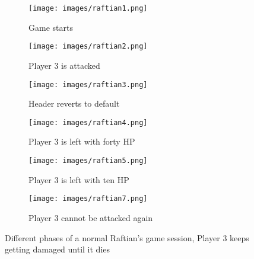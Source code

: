 \begin{figure}[h]
    \centering
    \begin{subfigure}{0.31\textwidth}
        \texttt{[image: images/raftian1.png]}
        \caption{Game starts}
    \end{subfigure}
    \hfill
    \begin{subfigure}{0.31\textwidth}
        \texttt{[image: images/raftian2.png]}
        \caption{Player 3 is attacked}
    \end{subfigure}
    \hfill
    \begin{subfigure}{0.31\textwidth}
        \texttt{[image: images/raftian3.png]}
        \caption{Header reverts to default}
    \end{subfigure}
    \hfill
    \begin{subfigure}{0.31\textwidth}
        \texttt{[image: images/raftian4.png]}
        \caption{Player 3 is left with forty HP}
    \end{subfigure}
    \hfill
    \begin{subfigure}{0.31\textwidth}
        \texttt{[image: images/raftian5.png]}
        \caption{Player 3 is left with ten HP}
    \end{subfigure}
    \hfill
    \begin{subfigure}{0.31\textwidth}
        \texttt{[image: images/raftian7.png]}
        \caption{Player 3 cannot be attacked again}
    \end{subfigure}

    \caption{Different phases of a normal Raftian's game session, Player 3 keeps getting damaged until it dies}
    \label{fig:raftianUI}
\end{figure}
